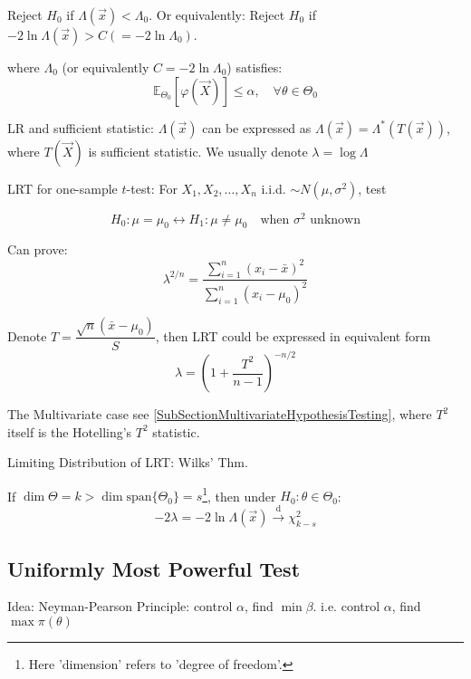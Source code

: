     Reject $H_0$ if $\Lambda(\vec{x})<\Lambda_0$. Or equivalently: Reject $H_0$ if $-2\ln\Lambda(\vec{x})>C(=-2\ln\Lambda_0)$.

    where $\Lambda_0$ (or equivalently $C=-2\ln\Lambda_0$) satisfies:
    \begin{equation}\mathbb{E}_{\Theta_0}[\varphi(\vec{X})]\leq\alpha,\quad\forall\theta\in\Theta_0\end{equation}

    LR and sufficient statistic: $\Lambda(\vec{x})$ can be expressed as $\Lambda(\vec{x})=\Lambda^*(T(\vec{x}))$, where $T(\vec{X})$ is sufficient statistic. We usually denote $ \lambda =\log \Lambda  $


\begin{point}
    LRT for one-sample $ t $-test: For $ X_1,X_2,\ldots,X_n $ i.i.d. $ \sim N(\mu,\sigma ^2) $, test

\[
    H_0: \mu=\mu_0\longleftrightarrow H_1:\mu\neq\mu_0\quad\text{when }\sigma ^2\text{ unknown}
\]

    Can prove:
    \[
        \lambda ^{2/n}=\dfrac{\sum\limits_{i=1}^n(x_i-\bar{x})^2}{\sum\limits_{i=1}^n(x_i-\mu_0)^2} 
    \]
    
    Denote $ T=\dfrac{\sqrt{n}(\bar{x}-\mu_0)}{S}$, then LRT could be expressed in equivalent form 
    \[
        \lambda  = \left( 1+\dfrac{T^2}{n-1} \right)^{-n/2}
    \]
    
    The Multivariate case see {\autoref{SubSectionMultivariateHypothesisTesting}}, where $ T^2 $ itself is the Hotelling's $ T^2 $ statistic.
    
    

\end{point}



\begin{point}
    Limiting Distribution of LRT: Wilks' Thm.
\end{point}

    

    
    If $\dim\Theta=k>\dim\mathrm{span}\{\Theta_0\}=s$\footnote{Here 'dimension' refers to 'degree of freedom'.}, then under $H_0:\theta\in\Theta_0$:
    \begin{equation}
        -2\lambda =-2\ln \Lambda (\vec{x})\xrightarrow[]{\mathrm{d}}\chi_{k-s}^2
    \end{equation}

\subsection{Uniformly Most Powerful Test}\label{SUbSectionUMP}
    Idea: Neyman-Pearson Principle: control $\alpha$, find $\min\beta$. i.e. control $\alpha$, find $\max\pi(\theta)$

